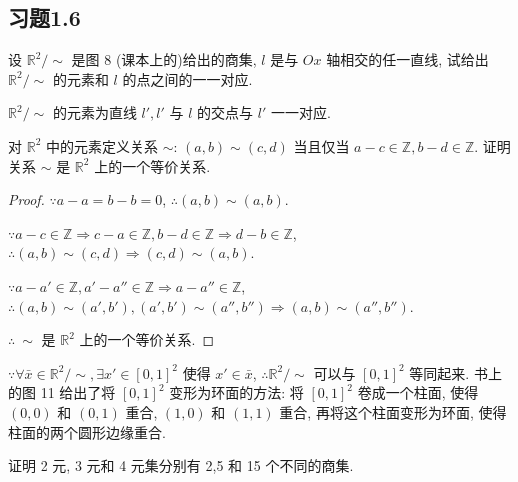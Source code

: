 \documentclass{ctexart}
\begin{document}
\subsection{习题1.6}
\begin{exercise}%
    设 $\mathbb{R}^2/\sim$ 是图 8 (课本上的)给出的商集, $l$ 是与 $Ox$ 轴相交的任一直线, 试给出 $\mathbb{R}^2/\sim$ 的元素和 $l$ 的点之间的一一对应.
\end{exercise}
\begin{solution}
    $\mathbb{R}^2/\sim$ 的元素为直线 $l',l'$ 与 $l$ 的交点与 $l'$ 一一对应.
\end{solution}
\begin{exercise}%
    对 $\mathbb{R}^2$ 中的元素定义关系 $\sim$: $(a,b)\sim(c,d)$ 当且仅当 $a-c\in\mathbb{Z},b-d\in\mathbb{Z}$. 证明关系 $\sim$ 是 $\mathbb{R}^2$ 上的一个等价关系.
\end{exercise}
\begin{proof}
    $\because a-a=b-b=0$, $\therefore(a,b)\sim(a,b)$.

    $\because a-c\in\mathbb{Z}\Rightarrow c-a\in\mathbb{Z},b-d\in\mathbb{Z}\Rightarrow d-b\in\mathbb{Z}$, $\therefore(a,b)\sim(c,d)\Rightarrow(c,d)\sim(a,b)$.

    $\because a-a'\in\mathbb{Z},a'-a''\in\mathbb{Z}\Rightarrow a-a''\in\mathbb{Z}$, $\therefore(a,b)\sim(a',b'),(a',b')\sim(a'',b'')\Rightarrow(a,b)\sim(a'',b'')$.

    $\therefore\ \sim$ 是 $\mathbb{R}^2$ 上的一个等价关系.
\end{proof}
\begin{note}
    $\because\forall\bar{x}\in\mathbb{R}^2/\sim,\exists x'\in[0,1]^2$ 使得 $x'\in\bar{x}$, $\therefore\mathbb{R}^2/\sim$ 可以与 $[0,1]^2$ 等同起来. 书上的图 11 给出了将 $[0,1]^2$ 变形为环面的方法: 将 $[0,1]^2$ 卷成一个柱面, 使得 $(0,0)$ 和 $(0,1)$ 重合, $(1,0)$ 和 $(1,1)$ 重合, 再将这个柱面变形为环面, 使得柱面的两个圆形边缘重合.
\end{note}
\begin{exercise}%
    证明 2 元, 3 元和 4 元集分别有 2,5 和 15 个不同的商集.
\end{exercise}
\end{document}
